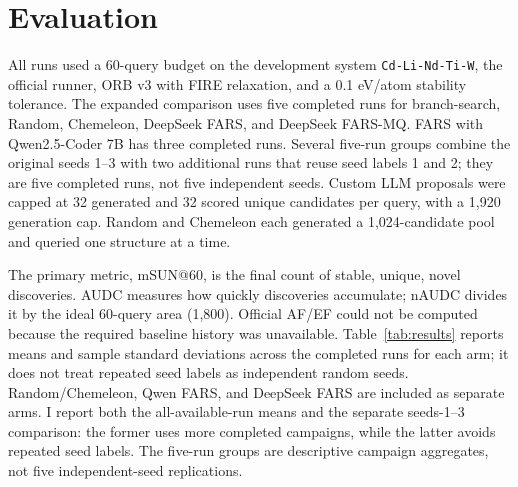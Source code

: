\documentclass[11pt,a4paper]{article}
\begin{document}
\section{Evaluation}
All runs used a 60-query budget on the development system
\texttt{Cd-Li-Nd-Ti-W}, the official runner, ORB v3 with FIRE relaxation,
and a 0.1 eV/atom stability tolerance. The expanded comparison uses five
completed runs for branch-search, Random, Chemeleon, DeepSeek FARS, and
DeepSeek FARS-MQ. FARS with Qwen2.5-Coder 7B has three completed runs.
Several five-run groups combine the original seeds 1--3 with two additional
runs that reuse seed labels 1 and 2; they are five completed runs, not five
independent seeds. Custom LLM proposals were capped at 32 generated and 32
scored unique candidates per query, with a 1,920 generation cap. Random and
Chemeleon each generated a 1,024-candidate pool and queried one structure
at a time.

\noindent The primary metric, mSUN@60, is the final count of stable, unique,
novel discoveries. AUDC measures how quickly discoveries accumulate;
nAUDC divides it by the ideal 60-query area (1,800). Official AF/EF could
not be computed because the required baseline history was unavailable.
Table~\ref{tab:results} reports means and sample standard deviations across
the completed runs for each arm; it does not treat repeated seed labels as
independent random seeds. Random/Chemeleon, Qwen FARS, and DeepSeek FARS
are included as separate arms.
I report both the all-available-run means and the separate seeds-1--3
comparison: the former uses more completed campaigns, while the latter
avoids repeated seed labels. The five-run groups are descriptive campaign
aggregates, not five independent-seed replications.
\end{document}
